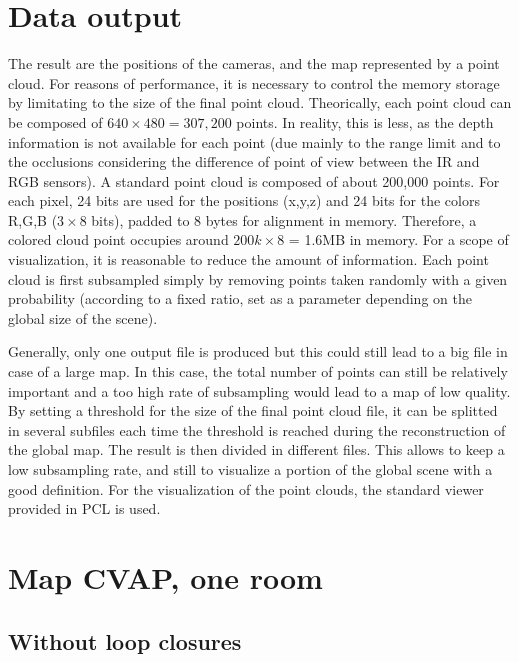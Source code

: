 \section{Data output}

The result are the positions of the cameras, and the map represented by a point cloud. For reasons of performance, it is necessary to control the memory storage by limitating to the size of the final point cloud. Theorically, each point cloud can be composed of $640\times480 = 307,200$ points. In reality, this is less, as the depth information is not available for each point (due mainly to the range limit and to the occlusions considering the difference of point of view between the \gls{IR} and RGB sensors). A standard point cloud is composed of about 200,000 points. For each pixel, 24 bits are used for the positions (x,y,z) and 24 bits for the colors R,G,B ($3\times8$ bits), padded to 8 bytes for alignment in memory. Therefore, a colored cloud point occupies around $200k\times8$ = 1.6MB in memory. For a scope of visualization, it is reasonable to reduce the amount of information. Each point cloud is first subsampled simply by removing points taken randomly with a given probability (according to a fixed ratio, set as a parameter depending on the global size of the scene).

Generally, only one output file is produced but this could still lead to a big file in case of a large map. In this case, the total number of points can still be relatively important and a too high rate of subsampling would lead to a map of low quality. By setting a threshold for the size of the final point cloud file, it can be splitted in several subfiles each time the threshold is reached during the reconstruction of the global map. The result is then divided in different files. This allows to keep a low subsampling rate, and still to visualize a portion of the global scene with a good definition. For the visualization of the point clouds, the standard viewer provided in \gls{PCL} is used.

\clearpage

\section{Map CVAP, one room}

\subsection{Without loop closures}

